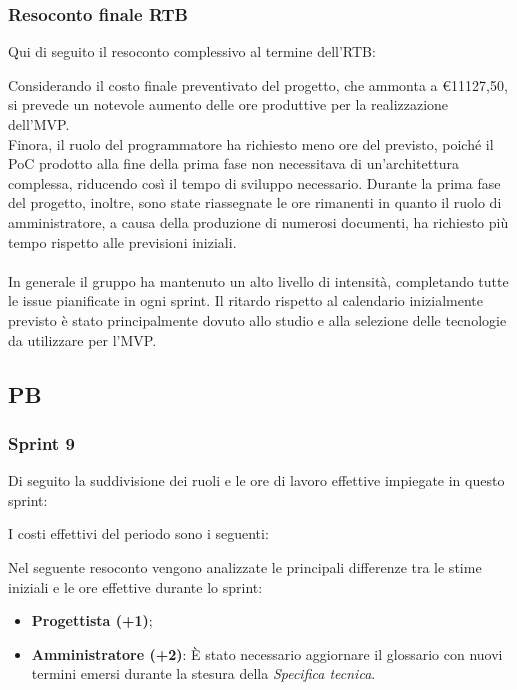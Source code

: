\subsubsection{Resoconto finale RTB}
Qui di seguito il resoconto complessivo al termine dell'RTB:



Considerando il costo finale preventivato del progetto, che ammonta a \euro{11127,50}, si prevede un notevole aumento delle ore produttive per la realizzazione dell'MVP.\\
Finora, il ruolo del programmatore ha richiesto meno ore del previsto, poiché il PoC prodotto alla fine della prima fase non necessitava di un'architettura complessa, riducendo così il tempo di sviluppo necessario. 
Durante la prima fase del progetto, inoltre, sono state riassegnate le ore rimanenti in quanto il ruolo di amministratore, a causa della produzione di numerosi documenti, ha richiesto più tempo rispetto alle previsioni iniziali.\\\\
In generale il gruppo ha mantenuto un alto livello di intensità, completando tutte le issue pianificate in ogni sprint. 
Il ritardo rispetto al calendario inizialmente previsto è stato principalmente dovuto allo studio e alla selezione delle tecnologie da utilizzare per l'MVP.

\pagebreak

\subsection{PB}

\subsubsection{Sprint 9}
Di seguito la suddivisione dei ruoli e le ore di lavoro effettive impiegate in questo sprint:



I costi effettivi del periodo sono i seguenti:



Nel seguente resoconto vengono analizzate le principali differenze tra le stime iniziali e le ore effettive durante lo sprint:
\begin{itemize}
    \item \textbf{Progettista (+1)}; 
    \item \textbf{Amministratore (+2)}: È stato necessario aggiornare il glossario con nuovi termini emersi durante la stesura della \textit{Specifica tecnica}.
\end{itemize}

